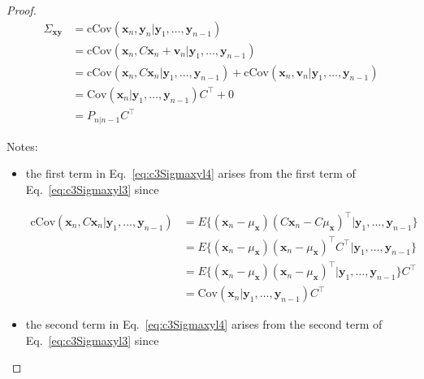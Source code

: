 \documentclass[12pt]{article}
\begin{document}
\begin{proof}
    \begin{align}
        \Sigma_{\mathbf{x}\mathbf{y}}&=\text{cCov}(\mathbf{x}_n,\mathbf{y}_n|\mathbf{y}_1,\ldots,\mathbf{y}_{n-1})\nonumber\\
                                     &=\text{cCov}(\mathbf{x}_n,C\mathbf{x}_n+\mathbf{v}_n|\mathbf{y}_1,\ldots,\mathbf{y}_{n-1})\nonumber\\
                                     &=\text{cCov}(\mathbf{x}_n,C\mathbf{x}_n|\mathbf{y}_1,\ldots,\mathbf{y}_{n-1})+\text{cCov}(\mathbf{x}_n,\mathbf{v}_n|\mathbf{y}_1,\ldots,\mathbf{y}_{n-1})\label{eq:c3Sigmaxyl3}\\
                                     &=\text{Cov}(\mathbf{x}_n|\mathbf{y}_1,\ldots,\mathbf{y}_{n-1})C^\intercal+0\label{eq:c3Sigmaxyl4}\\
                                     &=P_{n|n-1}C^\intercal\label{eq:sigmaxy}
    \end{align}

    Notes:

    \begin{itemize}
        \item the first term in Eq.~\ref{eq:c3Sigmaxyl4} arises from the first
            term of Eq.~\ref{eq:c3Sigmaxyl3} since

            \begin{align*}
                \text{cCov}(\mathbf{x}_n,C\mathbf{x}_n|\mathbf{y}_1,\ldots,\mathbf{y}_{n-1})&=E\{(\mathbf{x}_n-\mu_\mathbf{x})(C\mathbf{x}_n-C\mu_{\mathbf{x}})^\intercal|\mathbf{y}_1,\ldots,\mathbf{y}_{n-1}\}\\
                                                                                            &=E\{(\mathbf{x}_n-\mu_\mathbf{x})(\mathbf{x}_n-\mu_{\mathbf{x}})^\intercal C^\intercal|\mathbf{y}_1,\ldots,\mathbf{y}_{n-1}\}\\
                                                                                            &=E\{(\mathbf{x}_n-\mu_\mathbf{x})(\mathbf{x}_n-\mu_{\mathbf{x}})^\intercal|\mathbf{y}_1,\ldots,\mathbf{y}_{n-1}\}C^\intercal\\
                                                                                            &=\text{Cov}(\mathbf{x}_n|\mathbf{y}_1,\ldots,\mathbf{y}_{n-1})C^\intercal
            \end{align*}
        \item the second term in Eq.~\ref{eq:c3Sigmaxyl4} arises from the
            second
            term of Eq.~\ref{eq:c3Sigmaxyl3} since


\end{itemize}
\end{proof}
\end{document}
